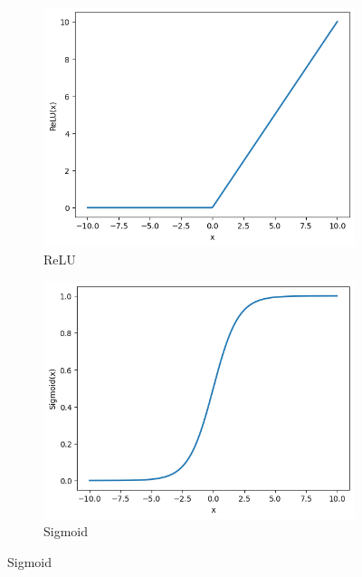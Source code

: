 \documentclass[a4paper,twoside,12pt]{book}
\begin{document}
\begin{figure}[!htbp]
	\centering
	\caption{Wykresy wybranych funckji aktywacji}
	\begin{subfigure}[b]{0.45\textwidth}
		\centering
		\includegraphics[width=\linewidth]{img/r5/relu.png}
		\caption{ReLU}
		\label{fig:wykres2}
	\end{subfigure}
	\hfill
	\begin{subfigure}[b]{0.45\textwidth}
		\centering
		\includegraphics[width=\linewidth]{img/r5/sigmoid.png}
		\caption{Sigmoid}
		\label{Sigmoid}
	\end{subfigure}
\end{figure}
\end{document}
